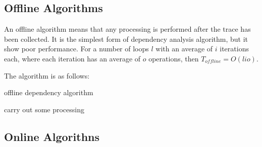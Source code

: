 	\subsection{Offline Algorithms} \label{sec:runtime/analysis/offline}
	An offline algorithm means that any processing is performed after the trace has been collected. It is the simplest form of dependency analysis algorithm, but it show poor performance. For a number of loops $l$ with an average of $i$ iterations each, where each iteration has an average of $o$ operations, then $T_{offline}=O(lio)$.
	
	The algorithm is as follows:
	
	\begin{algorithm}
		\caption{\Naive offline dependency algorithm}
		\label{alg:offline-dependency}
		\begin{algorithmic}[1]
			\STATE carry out some processing
	 		\ENDFOR
		\end{algorithmic}
	\end{algorithm}

	\subsection{Online Algorithns} \label{sec:runtime/analysis/online}